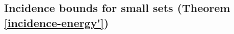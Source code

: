 \documentclass[11pt]{article}
\begin{document}



\subsection{Incidence bounds for small sets (Theorem \ref{incidence-energy'})}

\end{document}

